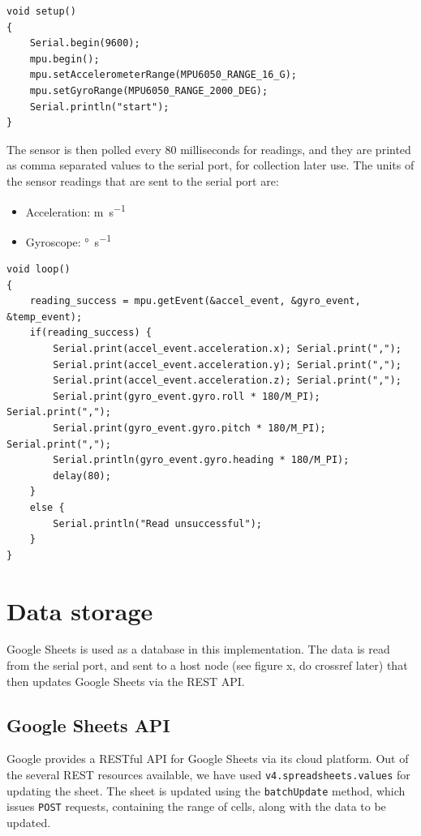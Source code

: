 \documentclass[a4paper,12pt]{report}
\begin{document}
\begin{verbatim}
void setup()
{
    Serial.begin(9600);
    mpu.begin();
    mpu.setAccelerometerRange(MPU6050_RANGE_16_G);
    mpu.setGyroRange(MPU6050_RANGE_2000_DEG);
    Serial.println("start");
}
\end{verbatim}

The sensor is then polled every 80 milliseconds for readings, and they are
printed as comma separated values to the serial port, for collection later use.
The units of the sensor readings that are sent to the serial port are:
\begin{itemize}
    \item Acceleration: \unit{\metre\per\second}
    \item Gyroscope: \unit{\degree\per\second}
\end{itemize}

\begin{verbatim}
void loop()
{
    reading_success = mpu.getEvent(&accel_event, &gyro_event, &temp_event);
    if(reading_success) {
        Serial.print(accel_event.acceleration.x); Serial.print(",");
        Serial.print(accel_event.acceleration.y); Serial.print(",");
        Serial.print(accel_event.acceleration.z); Serial.print(",");
        Serial.print(gyro_event.gyro.roll * 180/M_PI); Serial.print(",");
        Serial.print(gyro_event.gyro.pitch * 180/M_PI); Serial.print(",");
        Serial.println(gyro_event.gyro.heading * 180/M_PI);
        delay(80);
    }
    else {
        Serial.println("Read unsuccessful");
    }
}
\end{verbatim}

\section{Data storage}
Google Sheets is used as a database in this implementation. The data is read
from the serial port, and sent to a host node (see figure x, do crossref later)
that then updates Google Sheets via the REST API.

\subsection{Google Sheets API}
Google provides a RESTful API for Google Sheets via its cloud platform. Out of
the several REST resources available, we have used
\texttt{v4.spreadsheets.values} for updating the sheet. The sheet is
updated using the \texttt{batchUpdate} method, which issues
\texttt{POST} requests, containing the range of cells, along with the
data to be updated.
\end{document}
